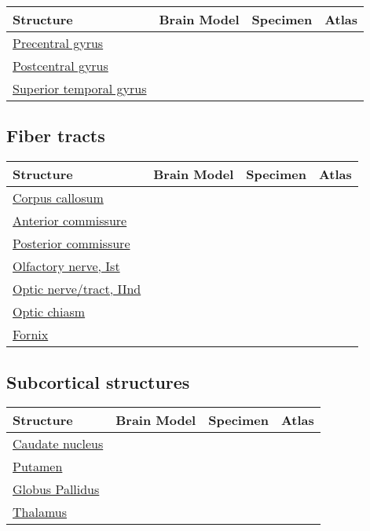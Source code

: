 \documentclass[]{article}
\begin{document}
\begin{longtable}[]{@{}llll@{}}
\toprule
Structure & Brain Model & Specimen & Atlas\tabularnewline
\midrule
\endhead
\href{https://en.wikipedia.org/wiki/Precentral_gyrus}{Precentral gyrus}
& & &\tabularnewline
\href{https://en.wikipedia.org/wiki/Postcentral_gyrus}{Postcentral
gyrus} & & &\tabularnewline
\href{https://en.wikipedia.org/wiki/Superior_temporal_gyrus}{Superior
temporal gyrus} & & &\tabularnewline
\bottomrule
\end{longtable}

\hypertarget{fiber-tracts}{%
\subsection{Fiber tracts}\label{fiber-tracts}}

\begin{longtable}[]{@{}llll@{}}
\toprule
Structure & Brain Model & Specimen & Atlas\tabularnewline
\midrule
\endhead
\href{https://en.wikipedia.org/wiki/Corpus_callosum}{Corpus callosum} &
& &\tabularnewline
\href{https://en.wikipedia.org/wiki/Anterior_commissure}{Anterior
commissure} & & &\tabularnewline
\href{https://en.wikipedia.org/wiki/Posterior_commissure}{Posterior
commissure} & & &\tabularnewline
\href{https://en.wikipedia.org/wiki/Olfactory_nerve}{Olfactory nerve,
Ist} & & &\tabularnewline
\href{https://en.wikipedia.org/wiki/Optic_nerve}{Optic nerve/tract,
IInd} & & &\tabularnewline
\href{https://en.wikipedia.org/wiki/Optic_chiasm}{Optic chiasm} & &
&\tabularnewline
\href{https://en.wikipedia.org/wiki/Fornix_(neuroanatomy}{Fornix} & &
&\tabularnewline
\bottomrule
\end{longtable}

\hypertarget{subcortical-structures}{%
\subsection{Subcortical structures}\label{subcortical-structures}}

\begin{longtable}[]{@{}llll@{}}
\toprule
Structure & Brain Model & Specimen & Atlas\tabularnewline
\midrule
\endhead
\href{https://en.wikipedia.org/wiki/Caudate_nucleus}{Caudate nucleus} &
& &\tabularnewline
\href{https://en.wikipedia.org/wiki/Putamen}{Putamen} & &
&\tabularnewline
\href{https://en.wikipedia.org/wiki/Globus_pallidus}{Globus Pallidus} &
& &\tabularnewline
\href{https://en.wikipedia.org/wiki/Thalamus}{Thalamus} & &
&\tabularnewline
\bottomrule
\end{longtable}
\end{document}
